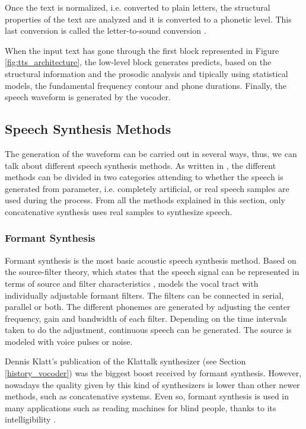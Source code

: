 Once the text is normalized, i.e. converted to plain letters, the structural properties of the text are analyzed and it is converted to a phonetic level. This last conversion is called the letter-to-sound conversion \cite{Pickett1999}. 

When the input text has gone through the first block represented in Figure \ref{fig:tts_architecture}, the low-level block generates predicts, based on the structural information and the prosodic analysis and tipically using statistical models, the fundamental frequency contour and phone durations. Finally, the speech waveform is generated by the vocoder. 

\subsection{Speech Synthesis Methods}
\label{speech_synthesis_systems_methods}
The generation of the waveform can be carried out in several ways, thus, we can talk about different speech synthesis methods. As written in \cite{TuomoMSc}, the different methods can be divided in two categories attending to whether the speech is generated from parameter, i.e. completely artificial, or real speech samples are used during the process. From all the methods explained in this section, only concatenative synthesis uses real samples to synthesize speech.

\subsubsection{Formant Synthesis}
\label{formant_speech_synthesis}
Formant synthesis is the most basic acoustic speech synthesis method. Based on the source-filter theory, which states that the speech signal can be represented in terms of source and filter characteristics \cite{Fant1970}, models the vocal tract with individually adjustable formant filters. The filters can be connected in serial, parallel or both. The different phonemes are generated by adjusting the center frequency, gain and bandwidth of each filter. Depending on the time intervals taken to do the adjustment, continuous speech can be generated. The source is modeled with voice pulses or noise.

Dennis Klatt's publication of the Klattalk synthesizer (see Section \ref{history_vocoder}) was the biggest boost received by formant synthesis. However, nowadays the quality given by this kind of synthesizers is lower than other newer methods, such as concatenative systems. Even so, formant synthesis is used in many applications such as reading machines for blind people, thanks to its intelligibility \cite{Pickett1999}.

